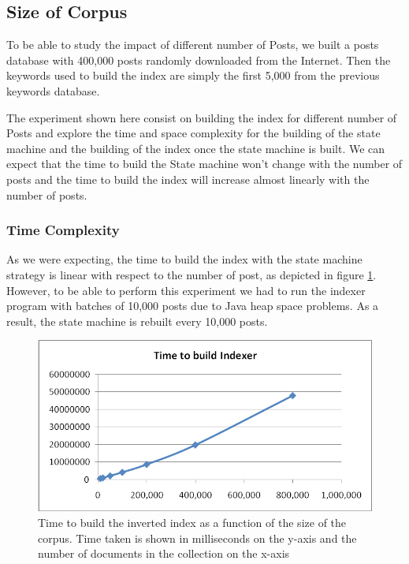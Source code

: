\documentclass[10pt]{article}
\begin{document}
\subsection{Size of Corpus}
To be able to study the impact of different number of Posts, we built
a posts database with 400,000 posts randomly downloaded from
the Internet. Then the keywords used to build the index are simply the
first 5,000 from the previous keywords database. 

The experiment shown here consist on building the index for different
number of Posts and explore the time and space complexity for the
building of the state machine and the building of the index once the
state machine is built. We can expect that the time to build the State
machine won’t change with the number of posts and the time to build
the index will increase almost linearly with the number of posts.  


\subsubsection{Time Complexity}
As we were expecting, the time to build the index with the state
machine strategy is linear with respect to the number of post, as
depicted in figure \ref{fig:corpsizetimecomplexbuildindex}. However, to be able
to perform this experiment we had to run the indexer program with
batches of 10,000 posts due to Java heap space problems. As a result, the state
machine is rebuilt every 10,000 posts.  

\begin{figure}[h!]
  \begin{center}
    \includegraphics[width=\textwidth,height=!]{corpsizetimecomplexbuildindex}
  \end{center}
    \caption{Time to build the inverted index as a function of the
      size of the corpus. Time taken is shown in milliseconds on the
      y-axis and the number of documents in the collection on the
      x-axis} 
    \label{fig:corpsizetimecomplexbuildindex}
\end{figure} 
\end{document}
